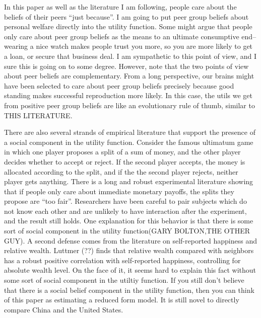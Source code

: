 \documentclass{article}
\begin{document}
In this paper as well as the literature I am following, people care about the beliefs of their peers ``just because''.  I am going to put peer group beliefs about personal welfare directly into the utility function.  Some might argue that people only care about peer group beliefs as the means to an ultimate consumptive end--wearing a nice watch makes people trust you more, so you are more likely to get a loan, or secure that business deal.  I am sympathetic to this point of view, and I sure this is going on to some degree.  However, note that the two points of view about peer beliefs are complementary.  From a long perspective, our brains might have been selected to care about peer group beliefs precisely because good standing makes successful reproduction more likely. In this case, the utils we get from positive peer group beliefs are like an evolutionary rule of thumb, similar to THIS LITERATURE.  

There are also several strands of empirical literature that support the presence of a social component in the utility function.  Consider the famous ultimatum game in which one player proposes a split of a sum of money, and the other player decides whether to accept or reject.  If the second player accepts, the money is allocated according to the split, and if the the second player rejects, neither player gets anything.  There is a long and robust experimental literature showing that if people only care about immediate monetary payoffs, the splits they propose are ``too fair''.  Researchers have been careful to pair subjects which do not know each other and are unlikely to have interaction after the experiment, and the result still holds.  One explanation for this behavior is that there is some sort of social component in the utility function(GARY BOLTON,THE OTHER GUY).  A second defense comes from the literature on self-reported happiness and relative wealth.  Luttmer (??) finds that relative wealth compared with neighbors has a robust positive correlation  with self-reported happiness, controlling for absolute wealth level.  On the face of it, it seems hard to explain this fact without some sort of social component in the utiltiy function.  If you still don't believe that there is a social belief component in the utility function, then you can think of this paper as estimating a reduced form model.  It is still novel to directly compare China and the United States.
\end{document}

